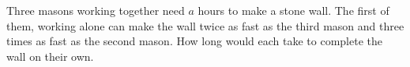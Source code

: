 
%
%
%
%
% 
% 

\question Three masons working together need $a$ hours to make a stone wall. The first of them, working alone can make the wall twice as fast as the third mason and three times as fast as the second mason. How long would each take to complete the wall on their own.

\insertQR{}

\ifprintanswers
\fi 

